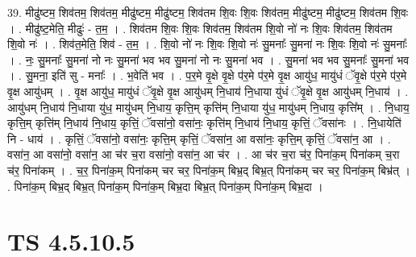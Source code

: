 \documentclass[17pt]{extarticle}
\begin{document}
39. मीढु॑ष्टम॒ शिव॑तम॒ शिव॑तम॒ मीढु॑ष्टम॒ मीढु॑ष्टम॒ शिव॑तम शि॒वः शि॒वः शिव॑तम॒ मीढु॑ष्टम॒ मीढु॑ष्टम॒ शिव॑तम शि॒वः । . मीढु॑ष्ट॒मेति॒ मीढुः॑ - त॒म॒ । . शिव॑तम शि॒वः शि॒वः शिव॑तम॒ शिव॑तम शि॒वो नो॑ नः शि॒वः शिव॑तम॒ शिव॑तम शि॒वो नः॑ । . शिव॑त॒मेति॒ शिव॑ - त॒म॒ । . शि॒वो नो॑ नः शि॒वः शि॒वो नः॑ सु॒मनाः᳚ सु॒मना॑ नः शि॒वः शि॒वो नः॑ सु॒मनाः᳚ । . नः॒ सु॒मनाः᳚ सु॒मना॑ नो नः सु॒मना॑ भव भव सु॒मना॑ नो नः सु॒मना॑ भव । . सु॒मना॑ भव भव सु॒मनाः᳚ सु॒मना॑ भव । . सु॒मना॒ इति॑ सु - मनाः᳚ । . भ॒वेति॑ भव । . प॒र॒मे वृ॒क्षे वृ॒क्षे प॑र॒मे प॑र॒मे वृ॒क्ष आयु॑ध॒ मायु॑धं ॅवृ॒क्षे प॑र॒मे प॑र॒मे वृ॒क्ष आयु॑धम् । . वृ॒क्ष आयु॑ध॒ मायु॑धं ॅवृ॒क्षे वृ॒क्ष आयु॑धम् नि॒धाय॑ नि॒धाया यु॑धं ॅवृ॒क्षे वृ॒क्ष आयु॑धम् नि॒धाय॑ । . आयु॑धम् नि॒धाय॑ नि॒धाया यु॑ध॒ मायु॑धम् नि॒धाय॒ कृत्ति॒म् कृत्ति॑म् नि॒धाया यु॑ध॒ मायु॑धम् नि॒धाय॒ कृत्ति᳚म् । . नि॒धाय॒ कृत्ति॒म् कृत्ति॑म् नि॒धाय॑ नि॒धाय॒ कृत्तिं॒ ॅवसा॑नो॒ वसा॑नः॒ कृत्ति॑म् नि॒धाय॑ नि॒धाय॒ कृत्तिं॒ ॅवसा॑नः । . नि॒धायेति॑ नि - धाय॑ । . कृत्तिं॒ ॅवसा॑नो॒ वसा॑नः॒ कृत्ति॒म् कृत्तिं॒ ॅवसा॑न॒ आ वसा॑नः॒ कृत्ति॒म् कृत्तिं॒ ॅवसा॑न॒ आ । . वसा॑न॒ आ वसा॑नो॒ वसा॑न॒ आ च॑र च॒रा वसा॑नो॒ वसा॑न॒ आ च॑र । . आ च॑र च॒रा च॑र॒ पिना॑क॒म् पिना॑कम् च॒रा च॑र॒ पिना॑कम् । . च॒र॒ पिना॑क॒म् पिना॑कम् चर चर॒ पिना॑क॒म् बिभ्र॒द् बिभ्र॒त् पिना॑कम् चर चर॒ पिना॑क॒म् बिभ्र॑त् । . पिना॑क॒म् बिभ्र॒द् बिभ्र॒त् पिना॑क॒म् पिना॑क॒म् बिभ्र॒दा बिभ्र॒त् पिना॑क॒म् पिना॑क॒म् बिभ्र॒दा । \newline
\pagebreak
{}

\section{ TS 4.5.10.5 }
\end{document}
